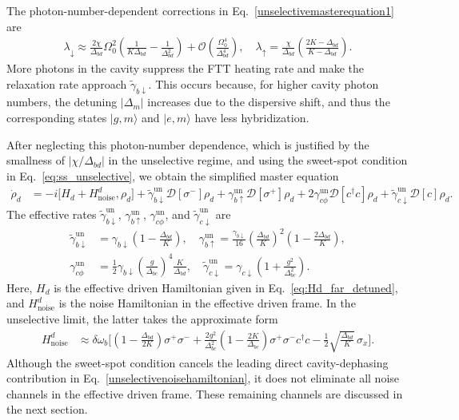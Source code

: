 The photon-number-dependent corrections in Eq.~\eqref{unselectivemasterequation1} are
\begin{align}
\lambda_\downarrow
\approx
\frac{2\chi}{\Delta_{bd}}\Omega_0^2
\left(
\frac{1}{K\Delta_{bd}}
- \frac{1}{\Delta_{bd}^2}
\right)
+ \mathcal{O}\!\left(\frac{\Omega_0^4}{\Delta_{bd}^4}\right),\quad
\lambda_\uparrow=
\frac{\chi}{\Delta_{bd}}
\left(
\frac{2K-\Delta_{bd}}{K-\Delta_{bd}}
\right).
\end{align}
More photons in the cavity suppress the FTT heating rate and make the relaxation rate approach $\widetilde{\gamma}_{b\downarrow}$. This occurs because, for higher cavity photon numbers, the detuning $|\Delta_m|$ increases due to the dispersive shift, and thus the corresponding states $|g,m\rangle$ and $|e,m\rangle$ have less hybridization.

After neglecting this photon-number dependence, which is justified by the smallness of $|\chi/\Delta_{bd}|$ in the unselective regime, and using the sweet-spot condition in Eq.~\eqref{eq:ss_unselective}, we obtain the simplified master equation
\begin{align}
\label{eq:Ldiss_unselective}
\dot{\rho}_d
&= -i \bigl[ H_d + H_{\mathrm{noise}}^d, \rho_d \bigr]
+ \widetilde{\gamma}_{b\downarrow}^{\mathrm{un}} \mathcal{D}[\sigma^-]\rho_d
+ \gamma_{b\uparrow}^{\mathrm{un}} \mathcal{D}[\sigma^+]\rho_d 
+ 2\gamma_{c\phi}^{\mathrm{un}} \mathcal{D}[c^\dagger c]\rho_d
+ \widetilde{\gamma}_{c\downarrow}^{\mathrm{un}} \mathcal{D}[c]\rho_d .
\end{align}
The effective rates $\widetilde{\gamma}_{b\downarrow}^{\mathrm{un}}$, $\gamma_{b\uparrow}^{\mathrm{un}}$, $\gamma_{c\phi}^{\mathrm{un}}$, and $\widetilde{\gamma}_{c\downarrow}^{\mathrm{un}}$ are
\begin{align}
\widetilde{\gamma}_{b\downarrow}^{\mathrm{un}}
&= \gamma_{b\downarrow}
\left(1-\frac{\Delta_{bd}}{K}\right), \quad\gamma_{b\uparrow}^{\mathrm{un}}
= \frac{\gamma_{b\downarrow}}{16}
\left(\frac{\Delta_{bd}}{K}\right)^2
\left(1-\frac{2\Delta_{bd}}{K}\right), \nonumber \\
\gamma_{c\phi}^{\mathrm{un}}
&= \frac{1}{2}\gamma_{b\downarrow}
\left(\frac{g}{\Delta_{bc}}\right)^4
\frac{K}{\Delta_{bd}}, \quad
\widetilde{\gamma}_{c\downarrow}^{\mathrm{un}}
= \gamma_{c\downarrow}
\left(1+\frac{g^2}{\Delta_{bc}^2}\right).
\end{align}
Here, $H_d$ is the effective driven Hamiltonian given in Eq.~\eqref{eq:Hd_far_detuned}, and $H_{\mathrm{noise}}^d$ is the noise Hamiltonian in the effective driven frame. In the unselective limit, the latter takes the approximate form
\begin{align}
\label{eq:Hnoise_unselective}
H_{\mathrm{noise}}^d
&\approx \delta\omega_b \Bigg[
\left(1 - \frac{\Delta_{bd}}{2K}\right)\sigma^+\sigma^-
+ \frac{2g^2}{\Delta_{bc}^2}
\left(1 - \frac{2K}{\Delta_{bc}}\right)
\sigma^+\sigma^- c^\dagger c
- \frac{1}{2}\sqrt{\frac{\Delta_{bd}}{K}}\,\sigma_x
\Bigg].
\end{align}
Although the sweet-spot condition cancels the leading direct cavity-dephasing contribution in Eq.~\eqref{unselectivenoisehamiltonian}, it does not eliminate all noise channels in the effective driven frame. These remaining channels are discussed in the next section.

